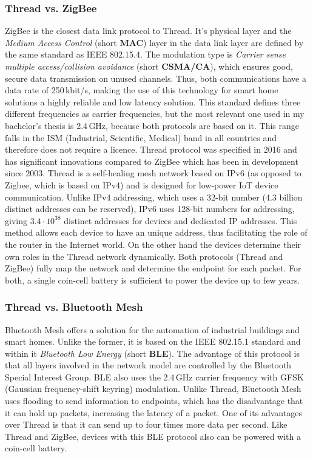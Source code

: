 \subsubsection{Thread vs. ZigBee}
ZigBee is the closest data link protocol to Thread. It's physical layer and the \textit{Medium Access Control} (short \textbf{MAC}) layer in the data link layer are defined by the same standard as IEEE 802.15.4. The modulation type is \textit{Carrier sense multiple access/collision avoidance} (short \textbf{CSMA/CA}), which ensures good, secure data transmission on unused channels. Thus, both communications have a data rate of 250\,\si{\kilo bit/s}, making the use of this technology for smart home solutions a highly reliable and low latency solution. This standard defines three different frequencies as carrier frequencies, but the most relevant one used in my bachelor's thesis is 2.4\,\si{\giga\hertz}, because both protocols are based on it. This range falls in the ISM (Industrial, Scientific, Medical)  band in all countries and therefore does not require a licence. Thread protocol was specified in 2016 and has significant innovations compared to ZigBee which has been in development since 2003. Thread is a self-healing mesh network based on IPv6 (as opposed to Zigbee, which is based on IPv4) and is designed for low-power IoT device communication. Unlike IPv4 addressing, which uses a 32-bit number (4.3 billion distinct addresses can be reserved), IPv6 uses 128-bit numbers for addressing, giving $3.4 \cdot 10^{38}$ distinct addresses for devices and dedicated IP addresses. This method allows each device to have an unique address, thus facilitating the role of the router in the Internet world. On the other hand the devices determine their own roles in the Thread network dynamically. Both protocols (Thread and ZigBee) fully map the network and determine the endpoint for each packet. For both, a single coin-cell battery is sufficient to power the device up to few years.

\subsubsection{Thread vs. Bluetooth Mesh}
Bluetooth Mesh offers a solution for the automation of industrial buildings and smart homes. Unlike the former, it is based on the IEEE 802.15.1 standard and within it \textit{Bluetooth Low Energy} (short \textbf{BLE}). The advantage of this protocol is that all layers involved in the network model are controlled by the Bluetooth Special Interest Group. BLE also uses the 2.4\,\si{\giga\hertz} carrier frequency with GFSK (Gaussian frequency-shift keyring) modulation. Unlike Thread, Bluetooth Mesh uses flooding to send information to endpoints, which has the disadvantage that it can hold up packets, increasing the latency of a packet. One of its advantages over Thread is that it can send up to four times more data per second. Like Thread and ZigBee, devices with this BLE protocol also can be powered with a coin-cell battery.

